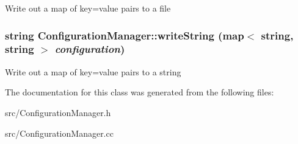 \label{classConfigurationManager_a078649c42cbc46e6fbdf7b7a74183898}
Write out a map of key=value pairs to a file \hypertarget{classConfigurationManager_a4dfba4665ffb818e21363f446a6cde12}{
\subsubsection[{writeString}]{\setlength{\rightskip}{0pt plus 5cm}string ConfigurationManager::writeString (map$<$ string, string $>$ {\em configuration})}}
\label{classConfigurationManager_a4dfba4665ffb818e21363f446a6cde12}
Write out a map of key=value pairs to a string 

The documentation for this class was generated from the following files:\begin{DoxyCompactItemize}
\item 
src/ConfigurationManager.h\item 
src/ConfigurationManager.cc\end{DoxyCompactItemize}
